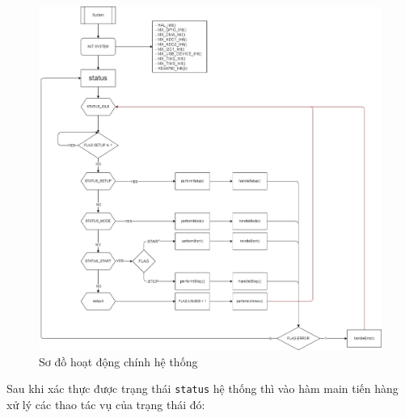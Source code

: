 \begin{figure}[H]
	\centering
	\includegraphics[width=\linewidth]{./diagram/main.png}
	\caption{Sơ đồ hoạt động chính hệ thống}
	\label{f_main system}
\end{figure}

Sau khi xác thực được trạng thái \texttt{status} hệ thống thì vào hàm main tiến hàng xử lý các thao tác vụ của trạng thái đó:

